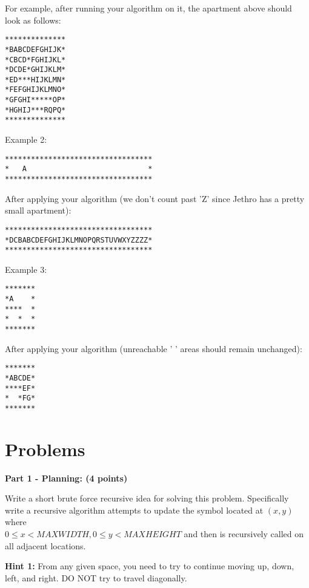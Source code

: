 \documentclass[12pt]{elsart}
\begin{document}
For example, after running your algorithm on it, the apartment above should look as follows:

{\small
\begin{verbatim}
**************
*BABCDEFGHIJK*
*CBCD*FGHIJKL*
*DCDE*GHIJKLM*
*ED***HIJKLMN*
*FEFGHIJKLMNO*
*GFGHI*****OP*
*HGHIJ***RQPQ*
**************
\end{verbatim}
}

Example 2:

{\small
\begin{verbatim}
**********************************
*   A                            *
**********************************
\end{verbatim}
}

After applying your algorithm (we don't count past 'Z' since Jethro has a pretty small apartment):

{\small
\begin{verbatim}
**********************************
*DCBABCDEFGHIJKLMNOPQRSTUVWXYZZZZ*
**********************************
\end{verbatim}
}

Example 3:

{\small
\begin{verbatim}
*******
*A    *
****  *
*  *  *
*******
\end{verbatim}
}

After applying your algorithm (unreachable ' ' areas should remain unchanged):

{\small
\begin{verbatim}
*******
*ABCDE*
****EF*
*  *FG*
*******
\end{verbatim}
}

\newpage

\section{Problems} 

{\bf Part 1 - Planning: (4 points)}

Write a short brute force recursive idea for solving this problem.  Specifically write a recursive algorithm attempts to update the symbol located at $(x,y)$ where \\$0 \leq x < MAXWIDTH, 0 \leq y < MAXHEIGHT$ and then is recursively called on all adjacent locations.

{\bf Hint 1:} From any given space, you need to try to continue moving up, down, left, and right. DO NOT try to travel diagonally.
\end{document}
